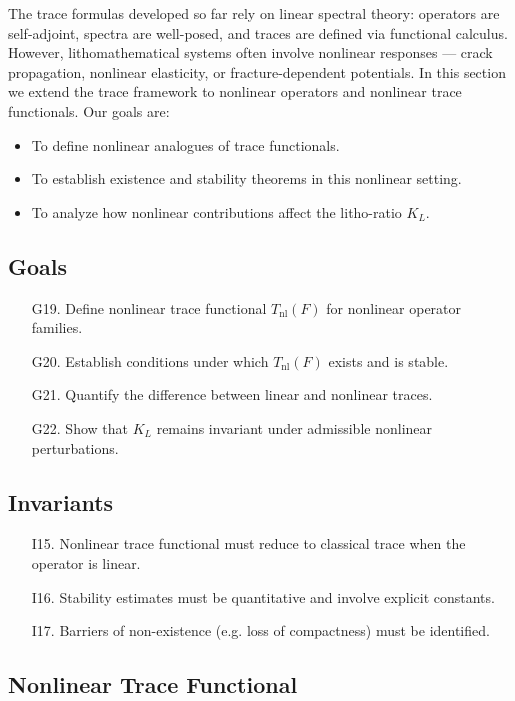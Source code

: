 The trace formulas developed so far rely on linear spectral theory: operators are self-adjoint, spectra are well-posed, and traces are defined via functional calculus. 
However, lithomathematical systems often involve nonlinear responses --- crack propagation, nonlinear elasticity, or fracture-dependent potentials. 
In this section we extend the trace framework to nonlinear operators and nonlinear trace functionals. 
Our goals are: 
\begin{itemize}
  \item To define nonlinear analogues of trace functionals.
  \item To establish existence and stability theorems in this nonlinear setting.
  \item To analyze how nonlinear contributions affect the litho-ratio $K_L$.
\end{itemize}

\subsection*{Goals}

\begin{itemize}
  \item[G19.] Define nonlinear trace functional $T_{\mathrm{nl}}(F)$ for nonlinear operator families. 
  \item[G20.] Establish conditions under which $T_{\mathrm{nl}}(F)$ exists and is stable. 
  \item[G21.] Quantify the difference between linear and nonlinear traces. 
  \item[G22.] Show that $K_L$ remains invariant under admissible nonlinear perturbations. 
\end{itemize}

\subsection*{Invariants}

\begin{itemize}
  \item[I15.] Nonlinear trace functional must reduce to classical trace when the operator is linear. 
  \item[I16.] Stability estimates must be quantitative and involve explicit constants. 
  \item[I17.] Barriers of non-existence (e.g. loss of compactness) must be identified. 
\end{itemize}

\subsection{Nonlinear Trace Functional}

